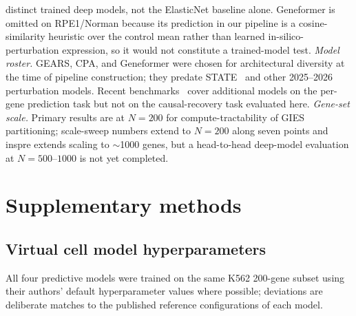 \documentclass{article}
\theoremstyle{plain}
\theoremstyle{definition}
\theoremstyle{remark}
\begin{document}
distinct trained deep models, not the ElasticNet baseline alone. Geneformer is omitted on RPE1/Norman because its prediction in our pipeline is a cosine-similarity heuristic over the control mean rather than learned in-silico-perturbation expression, so it would not constitute a trained-model test. \textit{Model roster.} GEARS, CPA, and Geneformer were chosen for architectural diversity at the time of pipeline construction; they predate STATE~\citep{adduri2025state,arc2025state} and other 2025--2026 perturbation models. Recent benchmarks~\citep{wong2025simple,csendes2025benchmark,wei2025benchmark,vinas2025systema} cover additional models on the per-gene prediction task but not on the causal-recovery task evaluated here. \textit{Gene-set scale.} Primary results are at $N=200$ for compute-tractability of GIES partitioning; scale-sweep numbers extend to $N=200$ along seven points and inspre extends scaling to $\sim$1000 genes, but a head-to-head deep-model evaluation at $N=500$--$1000$ is not yet completed.

\section{Supplementary methods}
\label{app:supp_methods}

\subsection{Virtual cell model hyperparameters}
\label{app:hparams}

All four predictive models were trained on the same K562 200-gene subset using their authors' default hyperparameter values where possible; deviations are deliberate matches to the published reference configurations of each model.
\end{document}
